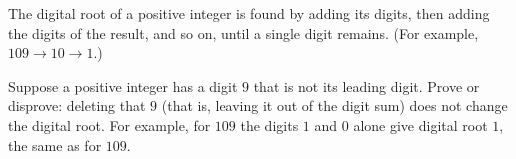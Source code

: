 The digital root of a positive integer is found by adding its digits, then adding the digits of the result, and so on, until a single digit remains. (For example, $109\to10\to1$.)

Suppose a positive integer has a digit $9$ that is not its leading digit. Prove or disprove: deleting that $9$ (that is, leaving it out of the digit sum) does not change the digital root. For example, for $109$ the digits $1$ and $0$ alone give digital root $1$, the same as for $109$.
